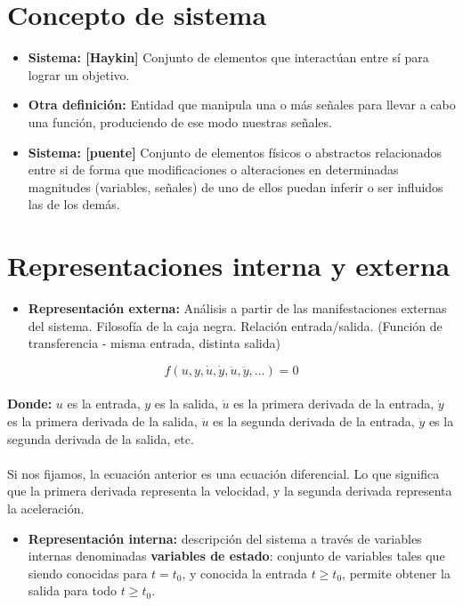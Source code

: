 \documentclass[a4paper,12pt,numbers=noenddot]{scrreprt}
\begin{document}
\section*{Concepto de sistema}
    \begin{itemize}
    \item \textbf{Sistema: [Haykin]} Conjunto de elementos que interactúan 
    entre sí para lograr un objetivo.
    \item[]\textbf{Otra definición:} Entidad que manipula una o más señales para llevar a 
    cabo una función, produciendo de ese modo nuestras señales.
    \item \textbf{Sistema: [puente]} Conjunto de elementos físicos o abstractos
    relacionados entre si de forma que modificaciones o alteraciones en determinadas
    magnitudes (variables, señales) de uno de ellos puedan inferir o ser influidos
    las de los demás. 
\end{itemize}

\section*{Representaciones interna y externa}
\begin{itemize}
    \item \textbf{Representación externa:} Análisis a partir de las manifestaciones
    externas del sistema. Filosofía de \textacutedbl la caja negra\textacutedbl. Relación
    entrada/salida. (Función de transferencia - misma entrada, distinta salida)
\end{itemize}

\begin{equation*}
    f(u, y, \dot{u}, \dot{y}, \ddot{u}, \ddot{y}, ...) = 0
\end{equation*} \\
\textbf{Donde:} $u$ es la entrada, $y$ es la salida, $\dot{u}$ es la primera 
derivada de la entrada, $\dot{y}$ es la primera derivada de la salida, $\ddot{u}$ 
es la segunda derivada de la entrada, $\ddot{y}$ es la segunda derivada de la salida, etc. \\
\\
Si nos fijamos, la ecuación anterior es una ecuación diferencial. Lo que significa
que la primera derivada representa la velocidad, y la segunda derivada representa 
la aceleración.

\begin{itemize}
\item \textbf{Representación interna:} descripción del sistema a través de
variables internas denominadas \textbf{variables de estado}: conjunto de variables
tales que siendo conocidas para $t=t_0$, y conocida la entrada $t \geq t_0$, 
permite obtener la salida para todo 
$t \geq t_0$. \\
\end{itemize}
\end{document}
